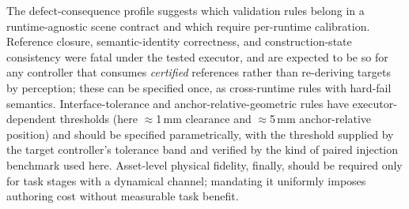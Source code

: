 The defect-consequence profile suggests which validation rules belong in a
runtime-agnostic scene contract and which require per-runtime calibration.
Reference closure, semantic-identity correctness, and construction-state
consistency were fatal under the tested executor, and are expected to be so
for any controller that consumes \emph{certified} references rather than
re-deriving targets by perception; these can be specified once, as
cross-runtime rules with hard-fail semantics. Interface-tolerance and
anchor-relative-geometric rules have executor-dependent thresholds (here
$\approx$1\,mm clearance and $\approx$5\,mm anchor-relative position) and
should be specified parametrically, with the threshold supplied by the target
controller's tolerance band and verified by the kind of paired injection
benchmark used here. Asset-level physical fidelity, finally, should be
required only for task stages with a dynamical channel; mandating it
uniformly imposes authoring cost without measurable task benefit.
